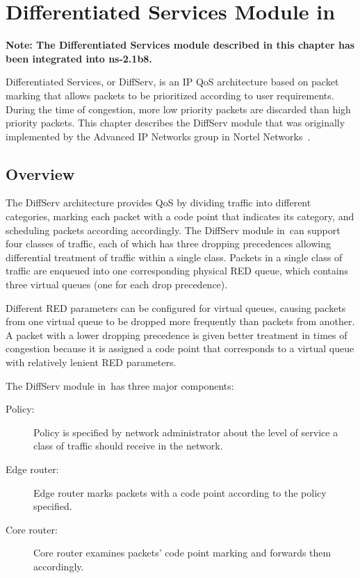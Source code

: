 %
% 
%
\chapter{Differentiated Services Module in \ns}
\label{chap:diffserv}

\textbf{Note: The Differentiated Services module described in this chapter has been integrated into ns-2.1b8.}

Differentiated Services, or DiffServ, is an IP QoS architecture based on 
  packet marking that allows packets to be prioritized according to user 
  requirements.  
During the time of congestion, 
  more low priority packets are discarded than high priority packets.
This chapter describes the DiffServ module that was originally 
  implemented by the Advanced IP Networks group in 
  Nortel Networks~\cite{Diffserv}.

\section{Overview}
\label{sec:diffservoverview}

The DiffServ architecture provides QoS by 
  dividing traffic into different categories, 
  marking each packet with a code point that indicates its category, 
  and scheduling packets according accordingly. 
The DiffServ module in~\ns can support four classes of traffic, 
  each of which has three dropping precedences allowing
  differential treatment of traffic within a single class. 
Packets in a single class of traffic are enqueued into 
  one corresponding physical RED queue, 
  which contains three virtual queues (one for each drop precedence).

Different RED parameters can be configured for virtual queues, 
  causing packets from one virtual queue to be dropped 
  more frequently than packets from another.  
A packet with a lower dropping precedence is given 
  better treatment in times of congestion 
  because it is assigned a code point that corresponds to a virtual 
  queue with relatively lenient RED parameters.  

The DiffServ module in~\ns has three major components:

\begin{description}
\item [Policy:]
Policy is specified by network administrator about 
  the level of service a class of traffic should receive in the network.  

\item [Edge router:]
Edge router marks packets with a code point according to the policy specified.

\item [Core router:]
Core router examines packets' code point marking and forwards them accordingly.

\end{description}

